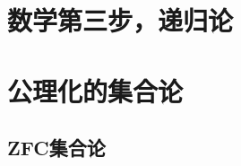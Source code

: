 \documentclass[main.tex]{subfiles}
\begin{document}
\section{数学第三步，递归论}

\section{公理化的集合论}






\subsection{\textsf{ZFC}集合论}
\end{document}
